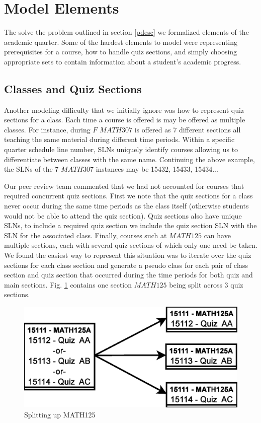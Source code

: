 \documentclass[11pt]{article} %
\begin{document}
\section{Model Elements} The solve the problem outlined in section \ref{pdesc}
we formalized elements of the academic quarter. Some of the hardest elements to
model were representing prerequisites for a course, how to handle quiz sections,
and simply choosing appropriate sets to contain information about a student's
academic progress.

\subsection{Classes and Quiz Sections} \label{classDefs} Another modeling
difficulty that we initially ignore was how to represent quiz sections for
a class. Each time a course is offered is may be offered as multiple classes.
For instance, during $F$ $MATH307$ is offered as 7 different sections all
teaching the same material during different time periods. Within a specific
quarter schedule line number, SLNs uniquely identify courses allowing us to
differentiate between classes with the same name. Continuing the above example,
the SLNs of the 7 $MATH307$ instances may be 15432, 15433, 15434...

Our peer review team commented that we had not accounted for courses that
required concurrent quiz sections. First we note that the quiz sections for
a class never occur during the same time periods as the class itself (otherwise
students would not be able to attend the quiz section). Quiz sections also have
unique SLNs, to include a required quiz section we include the quiz section SLN
with the SLN for the associated class. Finally, courses such at $MATH125$ can
have multiple sections, each with several quiz sections of which only one need
be taken. We found the easiest way to represent this situation was to iterate
over the quiz sections for each class section and generate a pseudo class for
each pair of class section and quiz section that occurred during the time periods
for both quiz and main sections. Fig. \ref{quizzes} contains one section
$MATH125$ being split across 3 quiz sections.
\begin{figure} [ht] 
    \begin{center}
        \includegraphics[scale=0.4]{quiz_sections} 
    \end{center}
    \caption{Splitting up MATH125} 
    \label{quizzes} 
\end{figure}
\end{document}

